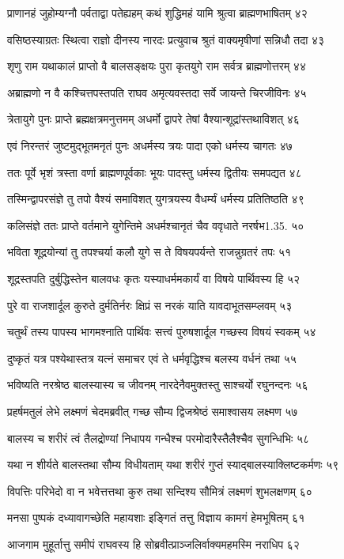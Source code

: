 प्राणानहं जुहोम्यग्नौ पर्वताद्वा पतेह्यहम्
कथं शुद्धिमहं यामि श्रुत्वा ब्राह्मणभाषितम् ४२

वसिष्ठस्याग्रतः स्थित्वा राज्ञो दीनस्य नारदः
प्रत्युवाच श्रुतं वाक्यमृषीणां सन्निधौ तदा ४३

शृणु राम यथाकालं प्राप्तो वै बालसङ्क्षयः
पुरा कृतयुगे राम सर्वत्र ब्राह्मणोत्तरम् ४४

अब्राह्मणो न वै कश्चित्तपस्तपति राघव
अमृत्यवस्तदा सर्वे जायन्ते चिरजीविनः ४५

त्रेतायुगे पुनः प्राप्ते ब्रह्मक्षत्रमनुत्तमम्
अधर्मो द्वापरे तेषां वैश्यान्शूद्रांस्तथाविशत् ४६

एवं निरन्तरं जुष्टमुद्भूतमनृतं पुनः
अधर्मस्य त्रयः पादा एको धर्मस्य चागतः ४७

ततः पूर्वे भृशं त्रस्ता वर्णा ब्राह्मणपूर्वकाः
भूयः पादस्तु धर्मस्य द्वितीयः समपद्यत ४८

तस्मिन्द्वापरसंज्ञे तु तपो वैश्यं समाविशत्
युगत्रयस्य वैधर्म्यं धर्मस्य प्रतितिष्ठति ४९

कलिसंज्ञे ततः प्राप्ते वर्तमाने युगेन्तिमे
अधर्मश्चानृतं चैव ववृधाते नरर्षभ1.35. ५०

भविता शूद्रयोन्यां तु तपश्चर्या कलौ युगे
स ते विषयपर्यन्ते राजन्नुग्रतरं तपः ५१

शूद्रस्तपति दुर्बुद्धिस्तेन बालवधः कृतः
यस्याधर्ममकार्यं वा विषये पार्थिवस्य हि ५२

पुरे वा राजशार्दूल कुरुते दुर्मतिर्नरः
क्षिप्रं स नरकं याति यावदाभूतसम्प्लवम् ५३

चतुर्थं तस्य पापस्य भागमश्नाति पार्थिवः
सत्त्वं पुरुषशार्दूल गच्छस्व विषयं स्वकम् ५४

दुष्कृतं यत्र पश्येथास्तत्र यत्नं समाचर
एवं ते धर्मवृद्धिश्च बलस्य वर्धनं तथा ५५

भविष्यति नरश्रेष्ठ बालस्यास्य च जीवनम्
नारदेनैवमुक्तस्तु साश्चर्यो रघुनन्दनः ५६

प्रहर्षमतुलं लेभे लक्ष्मणं चेदमब्रवीत्
गच्छ सौम्य द्विजश्रेष्ठं समाश्वासय लक्ष्मण ५७

बालस्य च शरीरं त्वं तैलद्रोण्यां निधापय
गन्धैश्च परमोदारैस्तैलैश्चैव सुगन्धिभिः ५८

यथा न शीर्यते बालस्तथा सौम्य विधीयताम्
यथा शरीरं गुप्तं स्याद्बालस्याक्लिष्टकर्मणः ५९

विपत्तिः परिभेदो वा न भवेत्तत्तथा कुरु
तथा सन्दिश्य सौमित्रं लक्ष्मणं शुभलक्षणम् ६०

मनसा पुष्पकं दध्यावागच्छेति महायशाः
इङ्गितं तत्तु विज्ञाय कामगं हेमभूषितम् ६१

आजगाम मुहूर्तात्तु समीपं राघवस्य हि
सोब्रवीत्प्राञ्जलिर्वाक्यमहमस्मि नराधिप ६२

